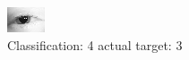 \begin{figure}[h!]
\begin{center}
\includegraphics[width=0.60\columnwidth]{figures/ID146_class_4_target_3.png}
\end{center}
\caption{ Classification: 4 actual target: 3}
\label{fig:ID146_class_4_target_3}
\end{figure}
